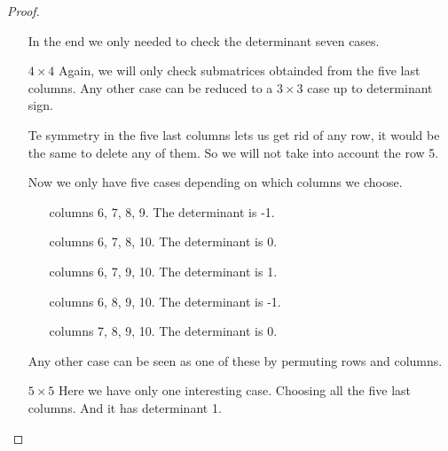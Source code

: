\begin{proof}
\begin{itemize}
            In the end we only needed to check the determinant seven cases.
            
        \item [$4 \times 4$]
            Again, we will only check submatrices obtainded from the five last columns. Any other case can be reduced to a $3 \times 3$
            case up to determinant sign.\pn
            
            Te symmetry in the five last columns lets us get rid of any row, it would be the same to delete any of them. So we will not
            take into account the row 5.
            
            Now we only have five cases depending on which columns we choose.
            \begin{itemize}
                \item[columns 6, 7, 8, 9.]
                    The determinant is -1.
                \item[columns 6, 7, 8, 10.]
                    The determinant is 0.
                \item[columns 6, 7, 9, 10.]
                    The determinant is 1.
                \item[columns 6, 8, 9, 10.]
                    The determinant is -1.
                \item[columns 7, 8, 9, 10.]
                    The determinant is 0.
            \end{itemize}
            
             Any other case can be seen as one of these by permuting rows and columns.
        \item [$5 \times 5$]
            Here we have only one interesting case. Choosing all the five last columns. And it has determinant 1.
    \end{itemize}
\end{proof}